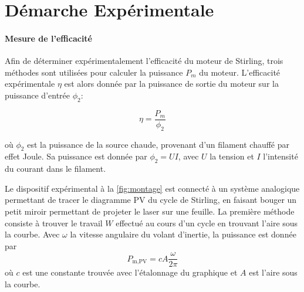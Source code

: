 \section{Démarche Expérimentale}

\paragraph{Mesure de l'efficacité}
Afin de déterminer expérimentalement l'efficacité du moteur de Stirling, trois méthodes sont utilisées pour calculer la puissance \(P_m\) du moteur. L'efficacité expérimentale \(\eta\) est alors donnée par la puissance de sortie du moteur sur la puissance d'entrée \(\phi_2\):

\begin{equation}
    \eta = \frac{P_m}{\phi_2}
    \label{eq:efficacite}
\end{equation}

où \(\phi_2\) est la puissance de la source chaude, provenant d'un filament chauffé par effet Joule. Sa puissance est donnée par \(\phi_2 = UI\), avec \(U\) la tension et \(I\) l'intensité du courant dans le filament.

Le dispositif expérimental à la \autoref{fig:montage} est connecté à un système analogique permettant de tracer le diagramme PV du cycle de Stirling, en faisant bouger un petit miroir permettant de projeter le laser sur une feuille. La première méthode consiste à trouver le travail \(W\) effectué au cours d'un cycle en trouvant l'aire sous la courbe. Avec \(\omega\) la vitesse angulaire du volant d'inertie, la puissance est donnée par 
\begin{equation}
    P_\textrm{m,PV} = c A \frac{\omega}{2 \pi}
    \label{eq:pm_pv}
\end{equation}
où \(c\) est une constante trouvée avec l'étalonnage du graphique et \(A\) est l'aire sous la courbe.

